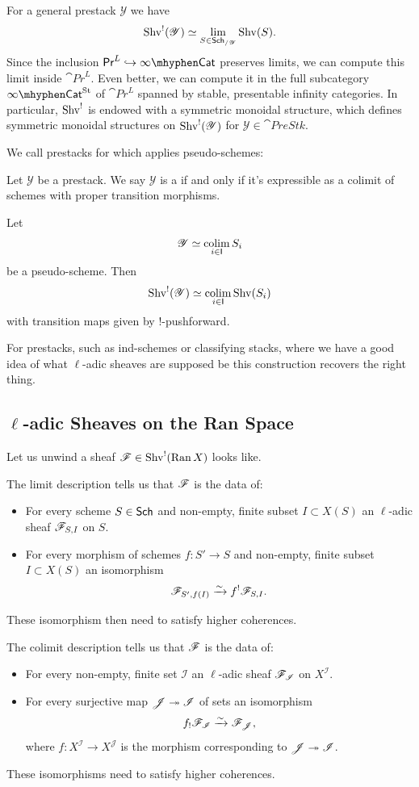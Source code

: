 \documentclass[oneside]{amsart}
\newcommand{\CI}{\mathcal{I}}
\newcommand{\PreStk}{\cat{PreStk}}
\newcommand{\CY}{\mathcal{Y}}
\newcommand{\CJ}{\mathcal{J}}
\newcommand{\PrL}{\cat{Pr}^L}
\begin{document}
For a general prestack $\CY$ we have
\[
\Shv^{!}(\CY) \isoto \lim_{S\in \Sch_{/\CY}} \Shv(S).
\] 
Since the inclusion $\PrL\injto \iCat$ preserves limits, we can compute this limit inside $\PrL$. Even better, we can compute it in the full subcategory $\iCatSt$ of $\PrL$ spanned by stable, presentable infinity categories. In particular, $\operatorname{Shv}^{!}$ is endowed with a symmetric monoidal structure, which defines symmetric monoidal structures on $\Shv^{!}(\CY)$ for $\CY\in \PreStk$.

We call prestacks for which  applies pseudo-schemes:
\begin{definition}
	Let $\CY$ be a prestack. We say $\CY$ is a  if and only if it's expressible as a colimit of schemes with proper transition morphisms.
\end{definition}
\begin{corollary}
	Let
	\[
		\CY \isoto \colim_{i\in \cat{I}} S_i
	\] 
	be a pseudo-scheme. Then
	\[
		\Shv^{!}(\CY) \isoto \colim_{i\in \cat{I}}\Shv(S_i)
	\] 
	with transition maps given by $!$-pushforward.
\end{corollary}
\begin{remark}
	For prestacks, such as ind-schemes or classifying stacks, where we have a good idea of what $\ell$-adic sheaves are supposed be this construction recovers the right thing.
\end{remark}

\subsection{\texorpdfstring{$\ell$-adic Sheaves on the Ran Space}{l-adic Sheaves on the Ran Space}}
Let us unwind a sheaf $\mathscr{F}\in \operatorname{Shv}^{!}(\operatorname{Ran} X)$ looks like.

The limit description tells us that $\mathscr{F}$ is the data of:
\begin{itemize}
	\item For every scheme $S\in \mathsf{Sch}$ and non-empty, finite subset $I\subset X(S)$ an $\ell$-adic sheaf $\mathscr{F}_{S,I}$ on $S$.
	\item For every morphism of schemes $f:S'\to S$ and non-empty, finite subset $I\subset X(S)$ an isomorphism
		\[
		\mathscr{F}_{S',f(I)} \xrightarrow{\sim} f^{!}\mathscr{F}_{S,I}.
		\] 
\end{itemize}
These isomorphism then need to satisfy higher coherences.

The colimit description tells us that $\mathscr{F}$ is the data of:
\begin{itemize}
	\item For every non-empty, finite set $\CI$ an $\ell$-adic sheaf $\CF_\CI$ on $X^{\CI}$.
	\item For every surjective map $\CJ\surjto \CI$ of sets an isomorphism
		\[
		f_!\CF_{\CI} \simto \CF_{\CJ},
		\] 
		where $f:X^{\CI}\to X^{\CJ}$ is the morphism corresponding to $\CJ\surjto \CI$.
\end{itemize}
These isomorphisms need to satisfy higher coherences.
\end{document}
